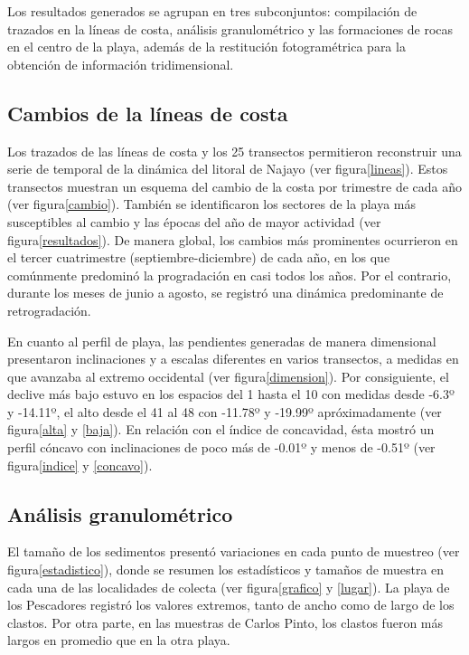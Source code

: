 \documentclass[11pt,]{article}
\begin{document}
Los resultados generados se agrupan en tres subconjuntos: compilación de
trazados en la líneas de costa, análisis granulométrico y las
formaciones de rocas en el centro de la playa, además de la restitución
fotogramétrica para la obtención de información tridimensional.

\subsection{Cambios de la líneas de
costa}\label{cambios-de-la-luxedneas-de-costa}

Los trazados de las líneas de costa y los 25 transectos permitieron
reconstruir una serie de temporal de la dinámica del litoral de Najayo
(ver figura\ref{lineas}). Estos transectos muestran un esquema del
cambio de la costa por trimestre de cada año (ver figura\ref{cambio}).
También se identificaron los sectores de la playa más susceptibles al
cambio y las épocas del año de mayor actividad (ver
figura\ref{resultados}). De manera global, los cambios más prominentes
ocurrieron en el tercer cuatrimestre (septiembre-diciembre) de cada año,
en los que comúnmente predominó la progradación en casi todos los años.
Por el contrario, durante los meses de junio a agosto, se registró una
dinámica predominante de retrogradación.

En cuanto al perfil de playa, las pendientes generadas de manera
dimensional presentaron inclinaciones y a escalas diferentes en varios
transectos, a medidas en que avanzaba al extremo occidental (ver
figura\ref{dimension}). Por consiguiente, el declive más bajo estuvo en
los espacios del 1 hasta el 10 con medidas desde -6.3º y -14.11º, el
alto desde el 41 al 48 con -11.78º y -19.99º apróximadamente (ver
figura\ref{alta} y \ref{baja}). En relación con el índice de concavidad,
ésta mostró un perfil cóncavo con inclinaciones de poco más de -0.01º y
menos de -0.51º (ver figura\ref{indice} y \ref{concavo}).

\subsection{Análisis
granulométrico}\label{anuxe1lisis-granulomuxe9trico}

El tamaño de los sedimentos presentó variaciones en cada punto de
muestreo (ver figura\ref{estadistico}), donde se resumen los
estadísticos y tamaños de muestra en cada una de las localidades de
colecta (ver figura\ref{grafico} y \ref{lugar}). La playa de los
Pescadores registró los valores extremos, tanto de ancho como de largo
de los clastos. Por otra parte, en las muestras de Carlos Pinto, los
clastos fueron más largos en promedio que en la otra playa.
\end{document}
